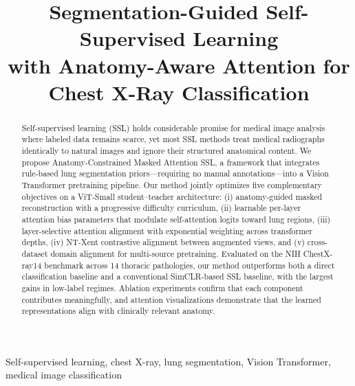 \documentclass[conference]{IEEEtran}
\begin{document}
\title{Segmentation-Guided Self-Supervised Learning\\with Anatomy-Aware Attention for Chest X-Ray Classification}

\author{
}

\maketitle

\begin{abstract}
Self-supervised learning (SSL) holds considerable promise for medical image analysis where labeled data remains scarce, yet most SSL methods treat medical radiographs identically to natural images and ignore their structured anatomical content. We propose Anatomy-Constrained Masked Attention SSL, a framework that integrates rule-based lung segmentation priors---requiring no manual annotations---into a Vision Transformer pretraining pipeline. Our method jointly optimizes five complementary objectives on a ViT-Small student--teacher architecture: (i) anatomy-guided masked reconstruction with a progressive difficulty curriculum, (ii) learnable per-layer attention bias parameters that modulate self-attention logits toward lung regions, (iii) layer-selective attention alignment with exponential weighting across transformer depths, (iv) NT-Xent contrastive alignment between augmented views, and (v) cross-dataset domain alignment for multi-source pretraining. Evaluated on the NIH ChestX-ray14 benchmark across 14 thoracic pathologies, our method outperforms both a direct classification baseline and a conventional SimCLR-based SSL baseline, with the largest gains in low-label regimes. Ablation experiments confirm that each component contributes meaningfully, and attention visualizations demonstrate that the learned representations align with clinically relevant anatomy.
\end{abstract}

\begin{IEEEkeywords}
Self-supervised learning, chest X-ray, lung segmentation, Vision Transformer, medical image classification
\end{IEEEkeywords}









\end{document}
